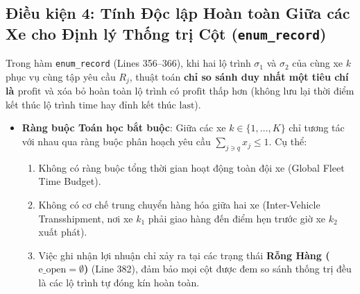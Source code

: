 \documentclass[11pt,a4paper]{article}
\theoremstyle{definition}
\begin{document}
\subsection{Điều kiện 4: Tính Độc lập Hoàn toàn Giữa các Xe cho Định lý Thống trị Cột (\texttt{enum\_record})}
Trong hàm \texttt{enum\_record} (Lines 356--366), khi hai lộ trình $\sigma_1$ và $\sigma_2$ của cùng xe $k$ phục vụ cùng tập yêu cầu $R_j$, thuật toán \textbf{chỉ so sánh duy nhất một tiêu chí là $\text{profit}$} và xóa bỏ hoàn toàn lộ trình có $\text{profit}$ thấp hơn (không lưu lại thời điểm kết thúc lộ trình $\text{time}$ hay đỉnh kết thúc $\text{last}$).
\begin{itemize}[leftmargin=1.5em]
    \item \textbf{Ràng buộc Toán học bắt buộc}: Giữa các xe $k \in \{1, \dots, K\}$ chỉ tương tác với nhau qua ràng buộc phân hoạch yêu cầu $\sum_{j \ni q} x_j \le 1$. Cụ thể:
    \begin{enumerate}[label=(4\alph*)]
        \item Không có ràng buộc tổng thời gian hoạt động toàn đội xe (Global Fleet Time Budget).
        \item Không có cơ chế trung chuyển hàng hóa giữa hai xe (Inter-Vehicle Transshipment, nơi xe $k_1$ phải giao hàng đến điểm hẹn trước giờ xe $k_2$ xuất phát).
        \item Việc ghi nhận lợi nhuận chỉ xảy ra tại các trạng thái \textbf{Rỗng Hàng ($\text{e\_open} = \emptyset$)} (Line 382), đảm bảo mọi cột được đem so sánh thống trị đều là các lộ trình tự đóng kín hoàn toàn.
    \end{enumerate}
\end{itemize}
\end{document}
